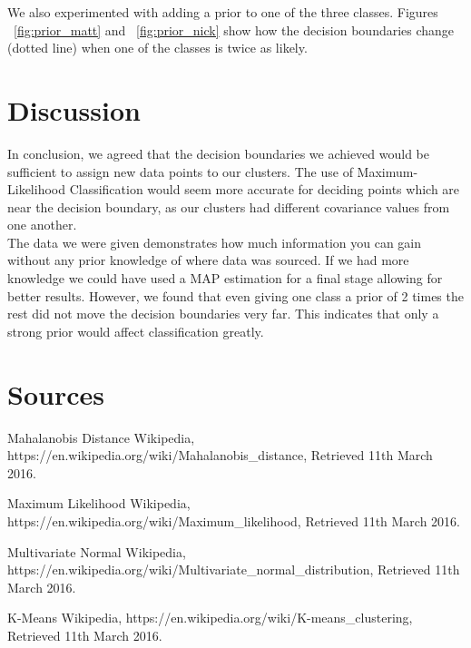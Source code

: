 \documentclass[11pt, a4paper]{article}
\begin{document}
We also experimented with adding a prior to one of the three classes. Figures ~\ref{fig:prior_matt} and ~\ref{fig:prior_nick} show how the decision boundaries change (dotted line) when one of the classes is twice as likely.

\section{Discussion}
In conclusion, we agreed that the decision boundaries we achieved would be sufficient to assign new data points to our clusters. The use of Maximum-Likelihood Classification would seem more accurate for deciding points which are near the decision boundary, as our clusters had different covariance values from one another. \\
The data we were given demonstrates how much information you can gain without any prior knowledge of where data was sourced. If we had more knowledge we could have used a MAP estimation for a final stage allowing for better results. However, we found that even giving one class a prior of 2 times the rest did not move the decision boundaries very far. This indicates that only a strong prior would affect classification greatly.

\section{Sources}
\renewcommand{\refname}{\vspace{-2em}}
\begin{thebibliography}{9}

  Mahalanobis Distance Wikipedia,
  https://en.wikipedia.org/wiki/Mahalanobis\_distance,
  Retrieved 11th March 2016.
  
  Maximum Likelihood Wikipedia,
  https://en.wikipedia.org/wiki/Maximum\_likelihood,
  Retrieved 11th March 2016.
  
  Multivariate Normal Wikipedia,
  https://en.wikipedia.org/wiki/Multivariate\_normal\_distribution,
  Retrieved 11th March 2016.
  
  K-Means Wikipedia,
  https://en.wikipedia.org/wiki/K-means\_clustering,
  Retrieved 11th March 2016.

\end{thebibliography}
\end{document}
